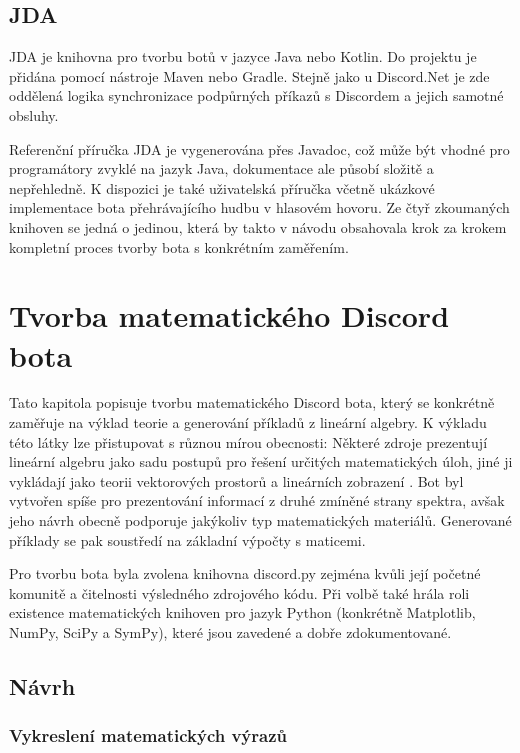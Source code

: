 \documentclass[FM]{tulthesis}
\begin{document}
	\section{JDA}
	
	JDA je knihovna pro tvorbu botů v jazyce Java nebo Kotlin. Do projektu je přidána pomocí nástroje Maven nebo Gradle. Stejně jako u Discord.Net je zde oddělená logika synchronizace podpůrných příkazů s Discordem a jejich samotné obsluhy.
	
	Referenční příručka JDA je vygenerována přes Javadoc, což může být vhodné pro programátory zvyklé na jazyk Java, dokumentace ale působí složitě a nepřehledně. K dispozici je také uživatelská příručka včetně ukázkové implementace bota přehrávajícího hudbu v hlasovém hovoru. Ze čtyř zkoumaných knihoven se jedná o jedinou, která by takto v návodu obsahovala krok za krokem kompletní proces tvorby bota s konkrétním zaměřením.
	
	\chapter{Tvorba matematického Discord bota}
	
	Tato kapitola popisuje tvorbu matematického Discord bota, který se konkrétně zaměřuje na výklad teorie a generování příkladů z lineární algebry. K výkladu této látky lze přistupovat s různou mírou obecnosti: Některé zdroje prezentují lineární algebru jako sadu postupů pro řešení určitých matematických úloh, jiné ji vykládají jako teorii vektorových prostorů a lineárních zobrazení \cite{lit_lingebra}. Bot byl vytvořen spíše pro prezentování informací z druhé zmíněné strany spektra, avšak jeho návrh obecně podporuje jakýkoliv typ matematických materiálů. Generované příklady se pak soustředí na základní výpočty s maticemi.
	
	Pro tvorbu bota byla zvolena knihovna discord.py zejména kvůli její početné komunitě a čitelnosti výsledného zdrojového kódu. Při volbě také hrála roli existence matematických knihoven pro jazyk Python (konkrétně Matplotlib, NumPy, SciPy a SymPy), které jsou zavedené a dobře zdokumentované.
		
	\section{Návrh}
	
	\subsection{Vykreslení matematických výrazů}
	
\end{document}
